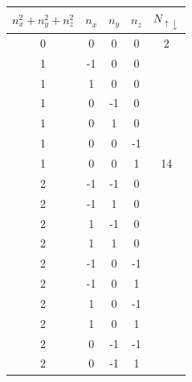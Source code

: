\begin{center}
\begin{tabular}{ccccc}
\hline
\multicolumn{1}{c}{ $n_{x}^{2}+n_{y}^{2}+n_{z}^{2}$ } & \multicolumn{1}{c}{ $n_{x}$ } & \multicolumn{1}{c}{ $n_{y}$ } & \multicolumn{1}{c}{ $n_{z}$ } & \multicolumn{1}{c}{ $N_{\uparrow \downarrow }$ } \\
\hline
0                               & 0       & 0       & 0       & 2                          \\
\hline
1                               & -1      & 0       & 0       &                            \\
1                               & 1       & 0       & 0       &                            \\
1                               & 0       & -1      & 0       &                            \\
1                               & 0       & 1       & 0       &                            \\
1                               & 0       & 0       & -1      &                            \\
1                               & 0       & 0       & 1       & 14                         \\
\hline
2                               & -1      & -1      & 0       &                            \\
2                               & -1      & 1       & 0       &                            \\
2                               & 1       & -1      & 0       &                            \\
2                               & 1       & 1       & 0       &                            \\
2                               & -1      & 0       & -1      &                            \\
2                               & -1      & 0       & 1       &                            \\
2                               & 1       & 0       & -1      &                            \\
2                               & 1       & 0       & 1       &                            \\
2                               & 0       & -1      & -1      &                            \\
2                               & 0       & -1      & 1       &                            \\

\end{tabular}
\end{center}
